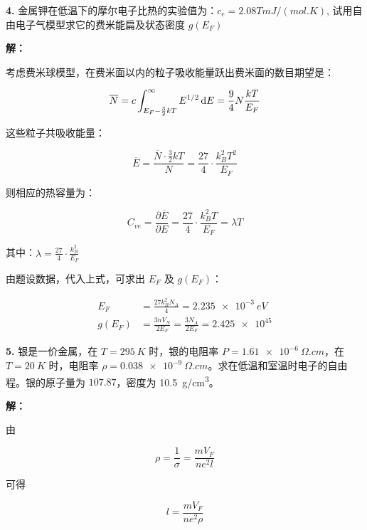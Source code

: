 \noindent \textbf{4.\quad} 金属钾在低温下的摩尔电子比热的实验值为：$c_e= 2.08 T \unit{mJ/(mol.K)}$, 试用自由电子气模型求它的费米能扁及状态密度 $g(E_F)$

\noindent \textbf{解：}

考虑费米球模型，在费米面以内的粒子吸收能量跃出费米面的数目期望是：

\begin{equation*}
    \overline{N} = c \int_{E_F-\frac{3}{2}kT}^{\infty} E^{1/2} \mathop{}\!\mathrm{d} E = \frac{9}{4} N \frac{kT}{E_F}
\end{equation*}

这些粒子共吸收能量：

\begin{equation*}
    \overline{E} = \frac{\overline{N} \cdot \frac{3}{2}kT}{N} = \frac{27}{4} \cdot \frac{k_B^2 T^2}{E_F}
\end{equation*}

则相应的热容量为：

\begin{equation*}
    C_{ve} = \frac{\partial \overline{E}}{\partial E} = \frac{27}{4} \cdot \frac{k_B^2 T}{E_F} = \lambda T
\end{equation*}

其中：$\lambda=\frac{27}{4} \cdot \frac{k_B^2}{E_F}$

由题设数据，代入上式，可求出 $E_F$ 及 $g(E_F)$：

\begin{align*}
    E_F &= \frac{27 k_B^2 N_A}{4} = \qty{2.235e-3}{eV} \\
    g(E_F) &= \frac{3n V_N}{2 E_F} = \frac{3 N_A}{2 E_F} = \num{2.425e45}
\end{align*}

\noindent \textbf{5.\quad} 银是一价金属，在 $T=\qty{295}{K}$ 时，银的电阻率 $P=\qty{1.61e-6}{\Omega.cm}$，在 $T=\qty{20}{K}$ 时，电阻率 $\rho=\qty{0.038e-9}{\Omega.cm}$。求在低温和室温时电子的自由程。银的原子量为 $107.87$，密度为 \qty{10.5}{g/cm^3}。

\noindent \textbf{解：}

由

\begin{equation*}
    \rho = \frac{1}{\sigma} = \frac{m V_F}{n e^2 l}
\end{equation*}

可得

\begin{equation*}
    l = \frac{m V_F}{n e^2 \rho}
\end{equation*}

